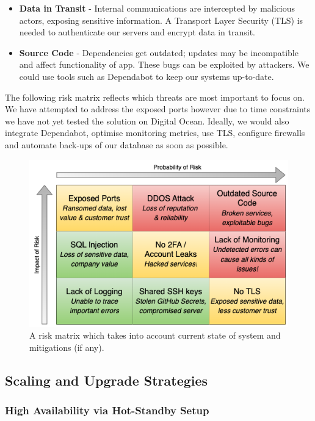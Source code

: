 \begin{itemize}
    \item \textbf{Data in Transit} - Internal communications are intercepted by malicious actors, exposing sensitive information. A Transport Layer Security (TLS) is needed to authenticate our servers and encrypt data in transit. 

    \item \textbf{Source Code} - Dependencies get outdated; updates may be incompatible and affect functionality of app. These bugs can be exploited by attackers. We could use tools such as Dependabot to keep our systems up-to-date.

\end{itemize}

The following risk matrix reflects which threats are most important to focus on. We have attempted to address the exposed ports however due to time constraints we have not yet tested the solution on Digital Ocean. Ideally, we would also integrate Dependabot, optimise monitoring metrics, use TLS, configure firewalls and automate back-ups of our database as soon as possible.

\begin{figure} [!htb]
    \centering
    \includegraphics[width=0.7\linewidth]{Images/riskmatrix.png}
    \caption{A risk matrix which takes into account current state of system and mitigations (if any).}
    \label{fig:Seq}
\end{figure}


\subsection{Scaling and Upgrade Strategies}

\subsubsection{High Availability via Hot-Standby Setup}

